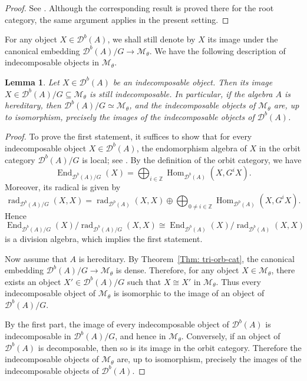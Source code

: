 \documentclass[12pt,reqno]{amsart}
\numberwithin{equation}{section}
\newcommand{\rad}{\operatorname{rad}\nolimits}
\newcommand{\End}{\operatorname{End}\nolimits}
\newcommand{\Hom}{\operatorname{Hom}\nolimits}
\newtheorem{lemma}[theorem]{Lemma}
\begin{document}
	\begin{proof}
		See \cite[Proposition~2.2]{Fu12}. Although the corresponding result is proved
		there for the root category, the same argument applies in the present setting.
	\end{proof}
	
	For any object $X\in \mathcal{D}^b(A)$, we shall still denote by $X$ its image under the canonical embedding
	$\mathcal{D}^b(A)/G \rightarrow \mathcal{M}_\theta$.
	We have the following description of indecomposable objects in $\mathcal{M}_\theta$.
	
	\begin{lemma}
		Let $X\in \mathcal{D}^b(A)$ be an indecomposable object. Then its image
		$X\in \mathcal{D}^b(A)/G \subseteq \mathcal{M}_\theta$
		is still indecomposable. In particular, if the algebra $A$ is hereditary, then $\mathcal{D}^b(A)/G \simeq \mathcal{M}_\theta$, and the indecomposable objects of $\mathcal{M}_\theta$ are, up to isomorphism, precisely the images of the indecomposable objects of $\mathcal{D}^b(A)$.
	\end{lemma}
	
	\begin{proof}
		To prove the first statement, it suffices to show that for every indecomposable object
		$X \in \mathcal{D}^b(A)$, the endomorphism algebra of $X$ in the orbit category
		$\mathcal{D}^b(A)/G$ is local; see \cite[Proposition~1.2]{BMRRT}. By the definition of the orbit category, we have
		\[
		\End_{\mathcal{D}^b(A)/G}(X)
		=
		\bigoplus_{i\in \mathbb{Z}}
		\Hom_{\mathcal{D}^b(A)}(X,G^iX).
		\]
		Moreover, its radical is given by
		\[
		\rad_{\mathcal{D}^b(A)/G}(X,X)
		=
		\rad_{\mathcal{D}^b(A)}(X,X)
		\oplus
		\bigoplus_{0\neq i\in \mathbb{Z}}
		\Hom_{\mathcal{D}^b(A)}(X,G^iX).
		\]
		Hence
		\[
		\End_{\mathcal{D}^b(A)/G}(X)/
		\rad_{\mathcal{D}^b(A)/G}(X,X)
		\cong
		\End_{\mathcal{D}^b(A)}(X)/
		\rad_{\mathcal{D}^b(A)}(X,X)
		\]
		is a division algebra, which implies the first statement.
		
		Now assume that $A$ is hereditary. By Theorem~\ref{Thm: tri-orb-cat}, the canonical
		embedding
		$\mathcal{D}^b(A)/G \rightarrow \mathcal{M}_\theta$
		is dense. Therefore, for any object $X\in \mathcal{M}_\theta$, there exists an object
		$X'\in \mathcal{D}^b(A)/G$ such that $X\cong X'$ in $\mathcal{M}_\theta$.
		Thus every indecomposable object of $\mathcal{M}_\theta$ is isomorphic to the image of
		an object of $\mathcal{D}^b(A)/G$.
		
		By the first part, the image of every indecomposable object of $\mathcal{D}^b(A)$ is
		indecomposable in $\mathcal{D}^b(A)/G$, and hence in $\mathcal{M}_\theta$. Conversely,
		if an object of $\mathcal{D}^b(A)$ is decomposable, then so is its image in the orbit
		category. Therefore the indecomposable objects of $\mathcal{M}_\theta$ are, up to
		isomorphism, precisely the images of the indecomposable objects of
		$\mathcal{D}^b(A)$.
	\end{proof}
	
\end{document}
